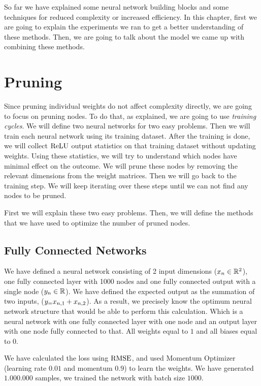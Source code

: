 So far we have explained some neural network building blocks and some techniques for reduced complexity or increased efficiency. In this chapter, first we are going to explain the experiments we ran to get a better understanding of these methods. Then, we are going to talk about the model we came up with combining these methods. 

\section{Pruning}
Since pruning individual weights do not affect complexity directly, we are going to focus on pruning nodes. To do that, as \cite{Hu:2016aa} explained, we are going to use \textit{training cycles}. We will define two neural networks for two easy problems. Then we will train each neural network using its training dataset. After the training is done, we will collect $\textrm{ReLU}$ output statistics on that training dataset without updating weights. Using these statistics, we will try to understand which nodes have minimal effect on the outcome. We will prune these nodes by removing the relevant dimensions from the weight matrices. Then we will go back to the training step. We will keep iterating over these steps until we can not find any nodes to be pruned. 

First we will explain these two easy problems. Then, we will define the methods that we have used to optimize the number of pruned nodes.


\subsection{Fully Connected Networks}
We have defined a neural network consisting of 2 input dimensions ($x_{n} \in \mathbb{R}^{2}$), one fully connected layer with 1000 nodes and one fully connected output with a single node ($y_{n} \in \mathbb{R}$). We have defined the expected output as the summation of two inputs, ($y_{=} x_{n,1} + x_{n,2}$). As a result, we precisely know the optimum neural network structure that would be able to perform this calculation. Which is a neural network with one fully connected layer with one node and an output layer with one node fully connected to that. All weights equal to $1$ and all biases equal to $0$.

We have calculated the loss using $\textrm{RMSE}$, and used Momentum Optimizer (learning rate $0.01$ and momentum $0.9$) to learn the weights. We have generated $1.000.000$ samples, we trained the network with batch size $1000$.

